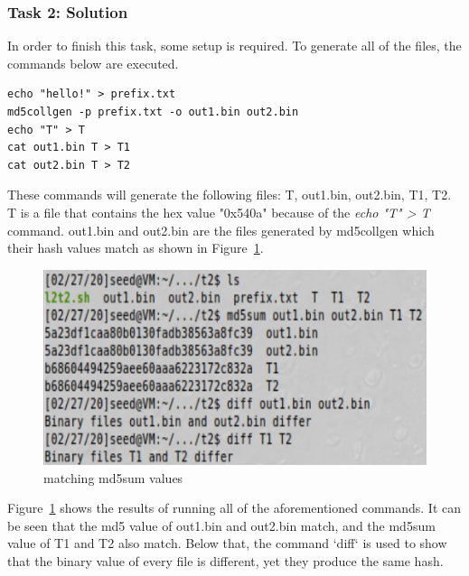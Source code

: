 \documentclass[12pt]{article}
\begin{document}
\subsubsection{Task 2: Solution}




In order to finish this task, some setup is required. To generate all of the files, the commands below are executed.
\begin{verbatim}
echo "hello!" > prefix.txt
md5collgen -p prefix.txt -o out1.bin out2.bin
echo "T" > T
cat out1.bin T > T1
cat out2.bin T > T2
\end{verbatim}

These commands will generate the following files: T, out1.bin, out2.bin, T1, T2. T is a file that contains the hex value "0x540a" because of the \emph{echo "T" > T} command. out1.bin and out2.bin are the files generated by md5collgen which their hash values match as shown in Figure~\ref{fig:t2p1}.

\begin{figure}[H]
	\begin{center}
		\includegraphics[scale=0.65]{pics/t2p1.png}
	\end{center}{}
	\caption{matching md5sum values}
	\label{fig:t2p1}
\end{figure}

Figure~\ref{fig:t2p1} shows the results of running all of the aforementioned commands. It can be seen that the md5 value of out1.bin and out2.bin match, and the md5sum value of T1 and T2 also match. Below that, the command `diff` is used to show that the binary value of every file is different, yet they produce the same hash.
\end{document}
